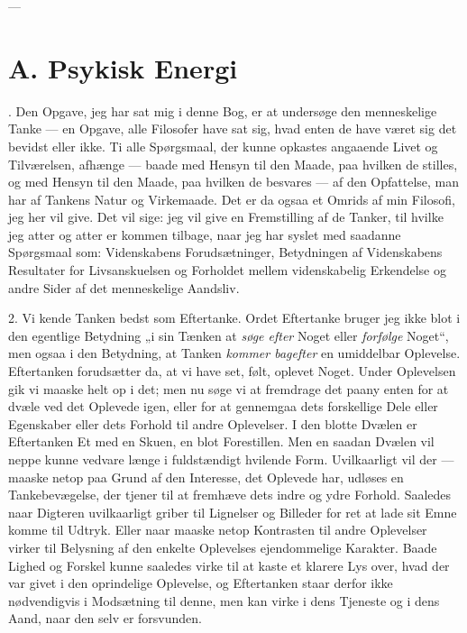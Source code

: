 \documentclass[12pt,a4paper]{book}
\newcommand{\apage}[1]{\marginnote{\footnotesize\textit{[#1]}}}
\begin{document}
\begin{center}---\end{center}

\section*{A. Psykisk Energi}
 \apage{1}
\label{sec:psykisk-energi}

. Den Opgave, jeg har sat mig i denne Bog, er at undersøge
den menneskelige Tanke --- en Opgave, alle Filosofer have sat sig,
hvad enten de have været sig det bevidst eller ikke. Ti alle
Spørgsmaal, der kunne opkastes angaaende Livet og Tilværelsen, afhænge
--- baade med Hensyn til den Maade, paa hvilken de stilles, og med
Hensyn til den Maade, paa hvilken de besvares --- af den Opfattelse,
man har af Tankens Natur og Virkemaade. Det er da ogsaa et Omrids af
min Filosofi, jeg her vil give. Det vil sige: jeg vil give en
Fremstilling af de Tanker, til hvilke jeg atter og atter er kommen
tilbage, naar jeg har syslet med saadanne Spørgsmaal som: Videnskabens
Forudsætninger, Betydningen af Videnskabens Resultater for
Livsanskuelsen og Forholdet mellem videnskabelig Erkendelse og andre
Sider af det menneskelige Aandsliv.

2. Vi kende Tanken bedst som Eftertanke. Ordet Eftertanke bruger jeg
ikke blot i den egentlige Betydning „i sin Tænken at \emph{søge efter}
Noget eller \emph{forfølge} Noget“, men ogsaa i den Betydning, at
Tanken \emph{kommer bagefter} en umiddelbar Oplevelse. Eftertanken
forudsætter da, at vi have set, følt, oplevet Noget. Under Oplevelsen
gik vi maaske helt op i det; men nu søge vi at fremdrage det paany
enten for at dvæle ved det Oplevede igen, eller for at gennemgaa dets
forskellige Dele eller Egenskaber eller dets Forhold til andre
Oplevelser. I den blotte Dvælen er Eftertanken Et med en Skuen, en
blot Forestillen. Men en saadan Dvælen vil neppe \apage{2} kunne vedvare længe i
fuldstændigt hvilende Form. Uvilkaarligt vil der --- maaske netop paa
Grund af den Interesse, det Oplevede har, udløses en Tankebevægelse,
der tjener til at fremhæve dets indre og ydre Forhold. Saaledes naar
Digteren uvilkaarligt griber til Lignelser og Billeder for ret at lade
sit Emne komme til Udtryk. Eller naar maaske netop Kontrasten til
andre Oplevelser virker til Belysning af den enkelte Oplevelses
ejendommelige Karakter. Baade Lighed og Forskel kunne saaledes virke
til at kaste et klarere Lys over, hvad der var givet i den oprindelige
Oplevelse, og Eftertanken staar derfor ikke nødvendigvis i Modsætning
til denne, men kan virke i dens Tjeneste og i dens Aand, naar den selv
er forsvunden.
\end{document}
